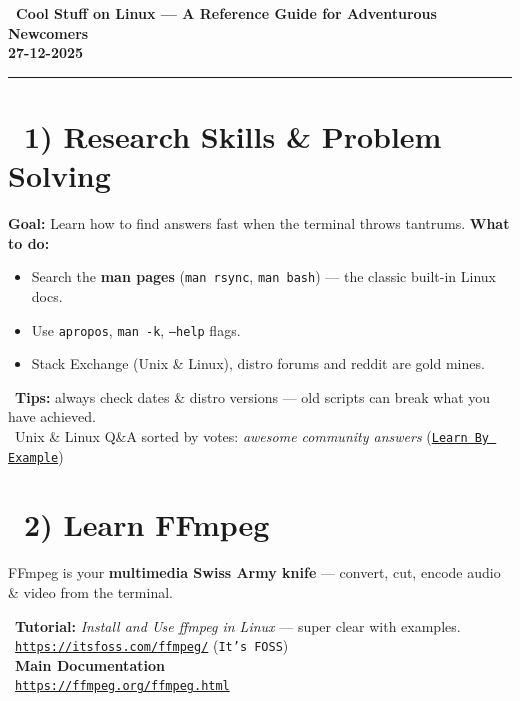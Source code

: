 \documentclass[12pt]{article}
\newcommand{\courseTitle}{Cool Stuff on Linux — A Reference Guide for Adventurous Newcomers}
\newcommand{\courseDate}{27-12-2025}
\newcommand{\bookicon}{\faBook}
\newcommand{\videoicon}{\faVideo}
\newcommand{\searchicon}{\faSearch}
\begin{document}
\begin{center}
\headingfont\Huge\bfseries\color{navy}
\bookicon\ \courseTitle\\[0.5em]
\Large\color{teamred}
\courseDate
\end{center}

\vspace{1em}
\begin{center}
\color{teamred}\rule{0.8\textwidth}{1pt}
\end{center}

\section*{\searchicon\ 1) Research Skills \& Problem Solving}

\textbf{Goal:} Learn how to find answers fast when the terminal throws tantrums.
\textbf{What to do:}

\begin{itemize}
    \item Search the \textbf{man pages} (\texttt{man rsync}, \texttt{man bash}) — the classic built-in Linux docs.
    \item Use \texttt{apropos}, \texttt{man -k}, \texttt{--help} flags.
    \item Stack Exchange (Unix \& Linux), distro forums and reddit are gold mines.
\end{itemize}

\begin{infobox}
\faLightbulb\ \textbf{Tips:} always check dates \& distro versions — old scripts can break what you have achieved.\\
\faArrowRight\ Unix \& Linux Q\&A sorted by votes: \textit{awesome community answers} (\href{https://learnbyexample.github.io/scripting_course/Linux_curated_resources.html}{\texttt{Learn By Example}})
\end{infobox}

\section*{\videoicon\ 2) Learn \textbf{FFmpeg}}

FFmpeg is your \textbf{multimedia Swiss Army knife} — convert, cut, encode audio \& video from the terminal.

\begin{infobox}
\bookicon\ \textbf{Tutorial:} \textit{Install and Use ffmpeg in Linux} — super clear with examples.\\
\faArrowRight\ \href{https://itsfoss.com/ffmpeg/}{\texttt{https://itsfoss.com/ffmpeg/}} (\texttt{It's FOSS})\\
\bookicon\ \textbf{Main Documentation}\\
\faArrowRight\ \href{https://ffmpeg.org/ffmpeg.html}{\texttt{https://ffmpeg.org/ffmpeg.html}}
\end{infobox}
\end{document}

